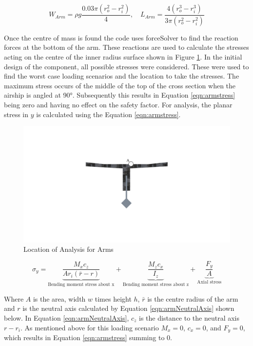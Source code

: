 \documentclass[../main.tex]{subfiles}
\begin{document}
\begin{equation} \label{eqn:armCg}
W_{Arm} = \rho g\frac{0.03\pi(r_o^2 - r_i^2)}{4}, \quad L_{Arm} =\frac{4(r_o^3 - r_i^3)}{3\pi(r_o^2 - r_i^2)}
\end{equation}

Once the centre of mass is found the code uses forceSolver to find the reaction forces at the bottom of the arm. These reactions are used to calculate the stresses acting on the centre of the inner radius surface shown in Figure \ref{fig:thrusterArmLoc}. In the initial design of the component, all possible stresses were considered. These were used to find the worst case loading scenarios and the location to take the stresses. The maximum stress occurs of the middle of the top of the cross section when the airship is angled at 90°. Subsequently this results in Equation \ref{eqn:armstress} being zero and having no effect on the safety factor. For analysis, the planar stress in $y$ is calculated using the Equation \ref{eqn:armstress}.

\begin{figure}[H]
	\centering
	\includegraphics[width=.5\linewidth]{img/analysis/arm/armLocation.pdf}
	\caption{Location of Analysis for Arms}
	\label{fig:thrusterArmLoc}
\end{figure}

\begin{equation}
\label{eqn:armstress}
\sigma_{y}=  \underbrace{\frac{M_{x}c_z}{A r_i (\bar{r} - r)}}_\text{Bending moment stress about x} + \underbrace{\frac{M_{z}c_x}{I_z}}_\text{Bending moment stress about z} + \underbrace{\frac{F_y}{A}}_\text{Axial stress} 
\end{equation}

Where $A$ is the area, width $w$ times height $h$, $\bar{r}$ is the centre radius of the arm and $r$ is the neutral axis calculated by Equation \ref{eqn:armNeutralAxis} shown below. In Equation \ref{eqn:armNeutralAxis}, $c_z$ is the distance to the neutral axis $r - r_i$. As mentioned above for this loading scenario $M_x = 0$, $c_x = 0$, and $F_y = 0$, which results in Equation \ref{eqn:armstress} summing to 0.
\end{document}
